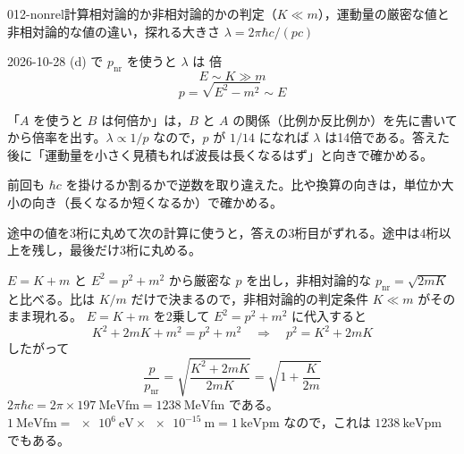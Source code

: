 \documentclass[uplatex,dvipdfmx,a4paper,11pt]{jsarticle}
\begin{document}
\begin{mondai}{012-nonrel}{計算}{相対論的か非相対論的かの判定（$K\ll m$），運動量の厳密な値と非相対論的な値の違い，探れる大きさ $\lambda=2\pi\hbar c/(pc)$}
\begin{kotaeutsushi}{2026-10-28}
(d) で $p_{\mathrm{nr}}$ を使うと $\lambda$ は  倍
\[ E\sim K\gg m \]
\[ p=\sqrt{E^{2}-m^{2}}\sim E \]
\end{kotaeutsushi}
\begin{kizuki}
\item 「$A$ を使うと $B$ は何倍か」は，$B$ と $A$ の関係（比例か反比例か）を先に書いてから倍率を出す。$\lambda\propto1/p$ なので，$p$ が $1/14$ になれば $\lambda$ は14倍である。答えた後に「運動量を小さく見積もれば波長は長くなるはず」と向きで確かめる。
\item {} 前回も $\hbar c$ を掛けるか割るかで逆数を取り違えた。比や換算の向きは，単位か大小の向き（長くなるか短くなるか）で確かめる。
\item {} 途中の値を3桁に丸めて次の計算に使うと，答えの3桁目がずれる。途中は4桁以上を残し，最後だけ3桁に丸める。
\end{kizuki}
\begin{tadashii}
\houshin $E=K+m$ と $E^2=p^2+m^2$ から厳密な $p$ を出し，非相対論的な $p_{\mathrm{nr}}=\sqrt{2mK}$ と比べる。比は $K/m$ だけで決まるので，非相対論的の判定条件 $K\ll m$ がそのまま現れる。
\keisan {} $E=K+m$ を2乗して $E^2=p^2+m^2$ に代入すると
\[ K^2+2mK+m^2=p^2+m^2\quad\Longrightarrow\quad p^2=K^2+2mK \]
したがって
\[ \frac{p}{p_{\mathrm{nr}}}=\sqrt{\frac{K^2+2mK}{2mK}}=\sqrt{1+\frac{K}{2m}} \]
 $2\pi\hbar c=2\pi\times\qty{197}{\mega\electronvolt\femto\metre}=\qty{1238}{\mega\electronvolt\femto\metre}$ である。$\qty{1}{\mega\electronvolt\femto\metre}=\qty{e6}{\electronvolt}\times\qty{e-15}{\metre}=\qty{1}{\kilo\electronvolt\pico\metre}$ なので，これは $\qty{1238}{\kilo\electronvolt\pico\metre}$ でもある。


\end{tadashii}
\end{mondai}
\end{document}
